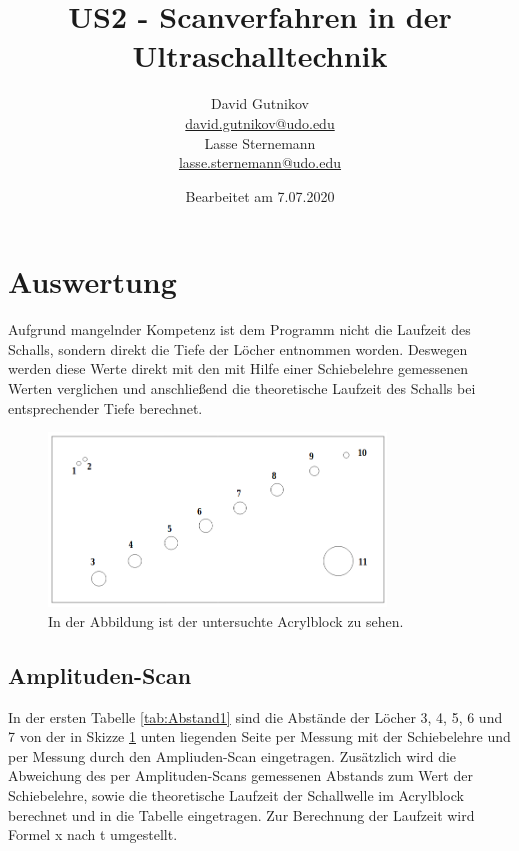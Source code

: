 \documentclass[titlepage = firstcover]{scrartcl}
\title{US2 - Scanverfahren in der Ultraschalltechnik}
\author{
  David Gutnikov\\
  \href{mailto:david.gutnikov@udo.edu}{david.gutnikov@udo.edu}\\
  Lasse Sternemann\\
  \href{mailto:lasse.sternemann@udo.edu}{lasse.sternemann@udo.edu}
}
\date{Bearbeitet am 7.07.2020}
\begin{document}
    \maketitle
    \newpage
    \tableofcontents
    \newpage

    \section{Auswertung}
        Aufgrund mangelnder Kompetenz ist dem Programm nicht die Laufzeit des Schalls, sondern direkt die Tiefe der Löcher entnommen worden. Deswegen werden diese Werte direkt mit den mit Hilfe
        einer Schiebelehre gemessenen Werten verglichen und anschließend die theoretische Laufzeit des Schalls bei entsprechender Tiefe berechnet.

        \FloatBarrier

        \begin{figure}[h]
          \centering
          \includegraphics[width = 0.8\textwidth]{Bilder/DerBlock.png}
          \caption{In der Abbildung ist der untersuchte Acrylblock zu sehen.}
          \label{fig:DerBlock}
        \end{figure}

        \FloatBarrier

        \noindent


        \subsection{Amplituden-Scan}
            In der ersten Tabelle \ref{tab:Abstand1} sind die Abstände der Löcher 3, 4, 5, 6 und 7 von der in Skizze \ref{fig:DerBlock} unten liegenden Seite per Messung mit der Schiebelehre und per Messung durch den 
            Ampliuden-Scan eingetragen. Zusätzlich wird die Abweichung des per Amplituden-Scans gemessenen Abstands zum Wert der Schiebelehre, sowie die theoretische Laufzeit der Schallwelle im
            Acrylblock berechnet und in die Tabelle eingetragen. Zur Berechnung der Laufzeit wird Formel x nach t umgestellt.
\end{document}
